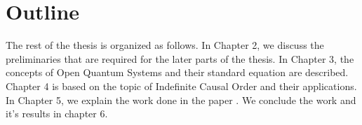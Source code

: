 \section{Outline}
The rest of the thesis is organized as follows. In Chapter 2, we discuss the preliminaries that are required for the later parts of the thesis. In Chapter 3, the concepts of Open Quantum Systems and their standard equation are described. Chapter 4 is based on the topic of Indefinite Causal Order and their applications. In Chapter 5, we explain the work done in the paper \cite{yanamandra2023breaking}. We conclude the work and it's results in chapter 6.